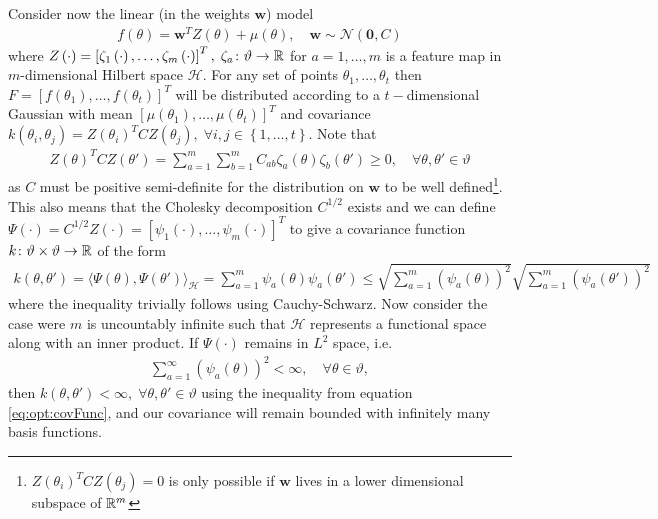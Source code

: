 Consider now the linear (in the weights $\mathbf{w}$) model
\begin{align}
\label{eq:opt:linModel}
f \left(\theta\right) = \mathbf{w}^T Z \left(\theta\right)  + \mu\left(\theta\right), \quad \mathbf{w} \sim \mathcal{N} \left(\mathbf{0}, C\right)
\end{align}
where $Z\left(\cdot\right) = \left[\zeta_1\left(\cdot\right),\dots,\zeta_m\left(\cdot\right)\right]^T, \; \zeta_a \colon \vartheta \rightarrow \mathbb{R}$ for $a = 1,\dots,m$ is a feature map in $m$-dimensional Hilbert space $\mathcal{H}$.  For any set of points $\theta_1,\dots,\theta_t$ then $F = \left[f\left(\theta_1\right),\dots,f\left(\theta_t\right)\right]^T$ will be distributed according to a $t-$dimensional Gaussian with mean $\left[\mu\left(\theta_1\right),\dots,\mu\left(\theta_t\right)\right]^T$ and covariance $k\left(\theta_i,\theta_j\right) = Z\left(\theta_i\right)^T C Z\left(\theta_j\right), \; \forall i,j \in \left\{1,\dots,t\right\}$.  Note that 
\begin{align}
\label{eq:opt:poskernel}
Z\left(\theta\right)^T C Z\left(\theta'\right) = \sum_{a=1}^{m} \sum_{b=1}^{m} C_{ab}\zeta_a\left(\theta\right)\zeta_b\left(\theta'\right) \ge 0, \quad \forall \theta, \theta' \in \vartheta
\end{align}
as $C$ must be positive semi-definite for the distribution on $\mathbf{w}$ to be well defined\footnote{$Z\left(\theta_i\right)^T C Z\left(\theta_j\right)=0$ is only possible if $\mathbf{w}$ lives in a lower dimensional subspace of $\mathbb{R}^m$}.  This also means that the Cholesky decomposition $C^{1/2}$ exists and we can define $\Psi\left(\cdot\right) = C^{1/2} Z\left(\cdot\right) = \left[\psi_1\left(\cdot\right),\dots,\psi_m\left(\cdot\right)\right]^T$ to give a covariance function $k \colon \vartheta \times \vartheta \rightarrow \mathbb{R}$ of the form
\begin{align}
\label{eq:opt:covFunc}
k\left(\theta,\theta'\right) = \langle\Psi\left(\theta\right), \Psi\left(\theta'\right)\rangle_{\mathcal{H}} = \sum_{a=1}^{m} \psi_a\left(\theta\right) \psi_a\left(\theta'\right) \le \sqrt{\sum_{a=1}^{m} \left(\psi_a\left(\theta\right)\right)^2} \sqrt{\sum_{a=1}^{m} \left(\psi_a\left(\theta'\right)\right)^2}
\end{align}
where the inequality trivially follows using Cauchy-Schwarz.  Now consider the case were $m$ is uncountably infinite such that $\mathcal{H}$ represents a functional space along with an inner product.  If $\Psi \left(\cdot\right)$ remains 
in $L^2$ space, i.e.
\begin{align}
\label{eq:opt:l2Space}
\sum_{a=1}^{\infty} \left(\psi_a\left(\theta\right)\right)^2 < \infty, \quad \forall \theta \in \vartheta,
\end{align}
then $k\left(\theta,\theta'\right) < \infty, \; \forall \theta, \theta' \in \vartheta$ using the inequality from equation \eqref{eq:opt:covFunc}, and our covariance will remain bounded with infinitely many basis functions.

